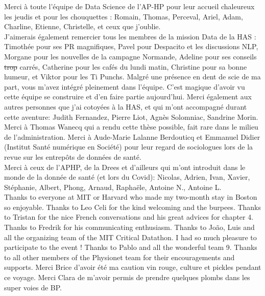 \documentclass[french,12pt,twoside,a4paper]{book}
\begin{document}
Merci à toute l'équipe de Data Science de l'AP-HP pour leur accueil chaleureux
les jeudis et pour les chouquettes : Romain, Thomas, Perceval, Ariel, Adam, Charline, Etienne,
Christelle, et ceux que j'oublie.\\

J'aimerais également remercier tous les membres de la mission Data de la HAS :
Timothée pour ses PR magnifiques, Pavel pour Despacito et les discussions NLP,
Morgane pour les nouvelles de la campagne Normande, Adeline pour ses conseils
\sout{trop} carrés, Catherine pour les cafés du lundi matin,
Christine pour sa bonne humeur, et Viktor pour les Ti Punchs. Malgré une
présence en dent de scie de ma part, vous m'avez intégré pleinement dans
l'équipe. C'est magique d'avoir vu cette équipe se construire et d'en faire
partie aujourd'hui. Merci également aux autres personnes que j'ai cotoyées à la
HAS, et qui m'ont accompagné durant cette aventure: Judith Fernandez, Pierre
Liot, Agnès Solomniac, Sandrine Morin. Merci à Thomas Wanecq qui a rendu cette
thèse possible, fait rare dans le milieu de l'administration. Merci à Aude-Marie
Lalanne Berdouticq et Emmanuel Didier (Institut Santé numérique en Société) pour
leur regard de sociologues lors de la revue sur les entrepôts de données de
santé.\\


Merci à ceux de l'APHP, de la Drees et d'ailleurs qui m'ont introduit dans le
monde de la donnée de santé (et lors du Covid): Nicolas, Adrien, Ivan, Xavier,
Stéphanie, Albert, Phong, Arnaud, Raphaële, Antoine N., Antoine L.\\

Thanks to everyone at MIT or Harvard who made my two-month stay in Boston so enjoyable. Thanks to Leo
Celi for the kind welcoming and the burpees. Thanks to Tristan for the nice
French conversations and his great advices for chapter 4. Thanks to Fredrik for
his communicating enthusiasm. Thanks to João, Luis and all the organizing team
of the MIT Critical Datathon. I had so much pleasure to participate to the event
! Thanks to Pablo and all the wonderful team 9. Thanks to all other members of
the Physionet team for their encouragements and supports. Merci Brice d'avoir
été ma caution vin rouge, culture et pickles pendant ce voyage. Merci Clara de
m'avoir permis de prendre quelques plombs dans les super voies de BP.\\
\end{document}
